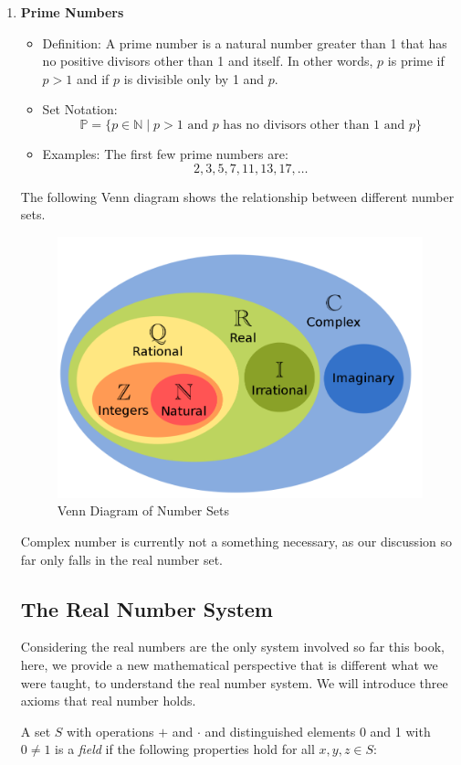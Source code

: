 \begin{enumerate}
  \item \textbf{Prime Numbers}
\begin{itemize}
  \item Definition: A prime number is a natural number greater than 1 that has no positive divisors other than 1 and itself. In other words, \( p \) is prime if \( p > 1 \) and if \( p \) is divisible only by 1 and \( p \).
  \item Set Notation:
  \[
  \mathbb{P} = \{p \in \mathbb{N} \mid p > 1 \text{ and } p \text{ has no divisors other than } 1 \text{ and } p\}
  \]
  \item Examples: The first few prime numbers are:
  \[
  2, 3, 5, 7, 11, 13, 17, \ldots
  \]
\end{itemize}
The following Venn diagram shows the relationship between different number sets.
\begin{figure}[H]
    \centering
    \includegraphics[width=0.5\linewidth]{venn.png}
    \caption{Venn Diagram of Number Sets}
    \label{venn}
\end{figure}

\begin{remark}
    Complex number is currently not a something necessary, as our discussion so far only falls in the real number set.
\end{remark}

\subsection{The Real Number System}
Considering the real numbers are the only system involved so far this book, here, we provide a new mathematical perspective that is different what we were taught, to understand the real number system. We will introduce three axioms that real number holds.
\begin{definition}\label{axi:field}
A set \( S \) with operations \( + \) and \( \cdot \) and distinguished elements 0 and 1 with \( 0 \neq 1 \) is a \emph{field} if the following properties hold for all \( x, y, z \in S \):


\end{definition}
\end{enumerate}
